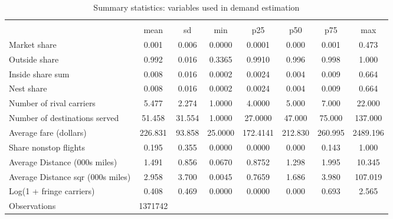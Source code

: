 \begin{table}[htbp]\centering
\def\sym#1{\ifmmode^{#1}\else\(^{#1}\)\fi}
\caption{Summary statistics: variables used in demand estimation}
\begin{tabular}{l*{1}{ccccccc}}
\toprule
                    &\multicolumn{7}{c}{}                                                                      \\
                    &        mean&          sd&         min&         p25&         p50&         p75&         max\\
\midrule
Market share        &       0.001&       0.006&      0.0000&      0.0001&       0.000&       0.001&       0.473\\
Outside share       &       0.992&       0.016&      0.3365&      0.9910&       0.996&       0.998&       1.000\\
Inside share sum    &       0.008&       0.016&      0.0002&      0.0024&       0.004&       0.009&       0.664\\
Nest share          &       0.008&       0.016&      0.0002&      0.0024&       0.004&       0.009&       0.664\\
Number of rival carriers&       5.477&       2.274&      1.0000&      4.0000&       5.000&       7.000&      22.000\\
Number of destinations served&      51.458&      31.554&      1.0000&     27.0000&      47.000&      75.000&     137.000\\
Average fare (dollars)&     226.831&      93.858&     25.0000&    172.4141&     212.830&     260.995&    2489.196\\
Share nonstop flights &       0.195&       0.355&      0.0000&      0.0000&       0.000&       0.143&       1.000\\
Average Distance (000s miles)&       1.491&       0.856&      0.0670&      0.8752&       1.298&       1.995&      10.345\\
Average Distance sqr (000s miles)&       2.958&       3.700&      0.0045&      0.7659&       1.686&       3.980&     107.019\\
Log(1 + fringe carriers)&       0.408&       0.469&      0.0000&      0.0000&       0.000&       0.693&       2.565\\
\midrule
Observations        &     1371742&            &            &            &            &            &            \\
\bottomrule
\end{tabular}
\end{table}
